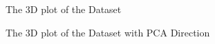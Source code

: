 \documentclass[paper=a4, fontsize=11pt]{scrartcl}
\numberwithin{equation}{section}		%
\numberwithin{figure}{section}			%
\numberwithin{table}{section}				%
\begin{document}
\graphicspath{ {../EE15B025_PA2/Code/q2/} }
\begin{figure}[H]
  \centering
  \hfill
  \caption*{The 3D plot of the Dataset}
\end{figure}

\begin{figure}[H]
  \centering
  \hfill
  \caption*{The 3D plot of the Dataset with PCA Direction}
\end{figure}
\end{document}
